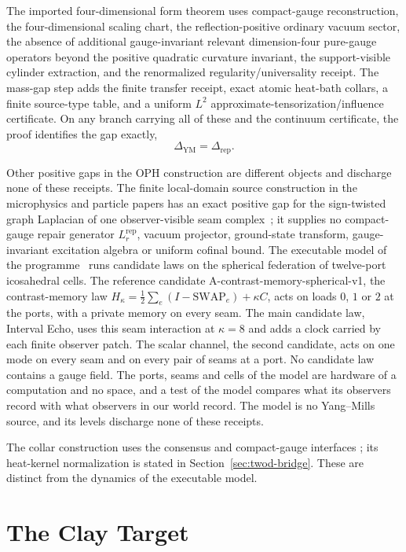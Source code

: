 \documentclass[11pt]{article}
\numberwithin{equation}{section}
\theoremstyle{remark}
\newcommand{\YM}{\mathrm{YM}}
\newcommand{\Rep}{\mathrm{rep}}
\begin{document}
The imported four-dimensional form theorem uses compact-gauge
reconstruction, the four-dimensional scaling chart, the reflection-positive
ordinary vacuum sector, the absence of additional gauge-invariant relevant
dimension-four pure-gauge operators beyond the positive quadratic curvature
invariant, the support-visible cylinder extraction, and the renormalized
regularity/universality receipt. The mass-gap step adds the finite transfer
receipt, exact atomic heat-bath collars, a finite source-type table, and a
uniform \(L^2\) approximate-tensorization/influence certificate. On any
branch carrying all of these and the continuum certificate, the proof
identifies the gap exactly,
\[
\Delta_{\YM}=\Delta_{\mathrm{rep}}.
\]

Other positive gaps in the OPH construction are different objects and
discharge none of these receipts. The finite local-domain source
construction in the microphysics and particle papers has an exact positive
gap for the sign-twisted graph Laplacian of one observer-visible seam
complex~\cite{oph5,ophfpe}; it supplies no compact-gauge repair generator
\(L^{\Rep}_r\), vacuum projector, ground-state transform, gauge-invariant
excitation algebra or uniform cofinal bound. The executable model of the
programme~\cite{ophmodel} runs candidate laws on the spherical federation of
twelve-port icosahedral cells. The reference candidate
A-contrast-memory-spherical-v1, the contrast-memory law
\(H_\kappa=\tfrac12\sum_e(I-\mathrm{SWAP}_e)+\kappa C\), acts on loads
\(0\), \(1\) or \(2\) at the ports, with a private memory on every seam. The
main candidate law, Interval Echo, uses this seam interaction at
\(\kappa=8\) and adds a clock carried by each finite observer patch. The
scalar channel, the second candidate, acts on one mode on every seam and on
every pair of seams at a port. No candidate law contains a gauge field. The ports, seams and cells of the model are hardware of a computation and no space, and a test of the model compares what its observers record with what observers in our world record. The model is no Yang--Mills source, and its levels
discharge none of these receipts.

The collar construction uses the consensus and compact-gauge interfaces
\cite{oph4,oph2}; its heat-kernel normalization is stated in
Section~\ref{sec:twod-bridge}. These are distinct from the dynamics of the
executable model.

\section{The Clay Target}
\end{document}
